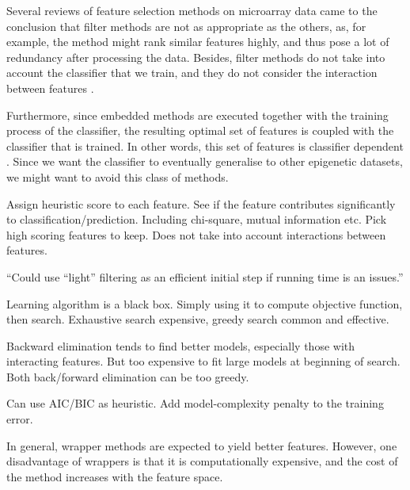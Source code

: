 \documentclass[12pt, twoside, a4paper]{article}
\begin{document}
Several reviews of feature selection methods on microarray data \cite{RefWorks:117, RefWorks:118} came to the conclusion that filter methods are not as appropriate as the others, as, for example, the method might rank similar features highly, and thus pose a lot of redundancy after processing the data. Besides, filter methods do not take into account the classifier that we train, and they do not consider the interaction between features \cite{RefWorks:119}.

Furthermore, since embedded methods are executed together with the training process of the classifier, the resulting optimal set of features is coupled with the classifier that is trained. In other words, this set of features is classifier dependent \cite{RefWorks:118}. Since we want the classifier to eventually generalise to other epigenetic datasets, we might want to avoid this class of methods. 

Assign heuristic score to each feature. See if the feature contributes significantly to classification/prediction. Including chi-square, mutual information etc. Pick high scoring features to keep. Does not take into account interactions between features.

``Could use ``light'' filtering as an efficient initial step if running time is an issues.''	


Learning algorithm is a black box. Simply using it to compute objective function, then search. Exhaustive search expensive, greedy search common and effective.

Backward elimination tends to find better models, especially those with interacting features. But too expensive to fit large models at beginning of search. Both back/forward elimination can be too greedy.

Can use AIC/BIC as heuristic. Add model-complexity penalty to the training error.


In general, wrapper methods are expected to yield better features. However, one disadvantage of wrappers is that it is computationally expensive, and the cost of the method increases with the feature space.
\end{document}
